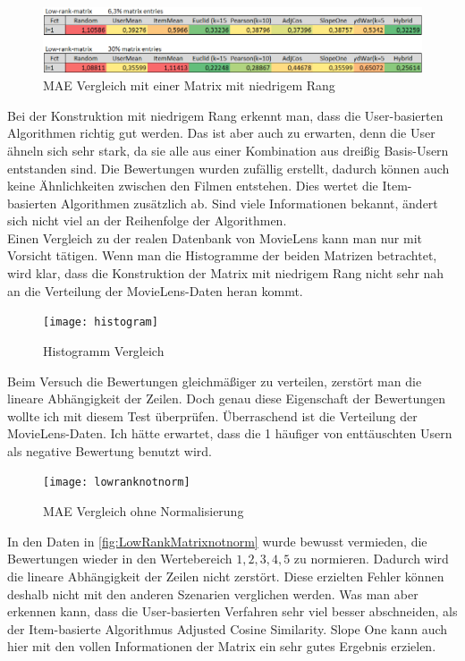 \begin{figure}[h!]
	\centering
	\includegraphics[width=1\linewidth]{bilder/lowrank}
	\caption{MAE Vergleich mit einer Matrix mit niedrigem Rang}
	\label{fig:LowRankMatrix}
\end{figure}
\FloatBarrier
Bei der Konstruktion mit niedrigem Rang erkennt man, dass die User-basierten Algorithmen richtig gut werden. Das ist aber auch zu erwarten, denn die User ähneln sich sehr stark, da sie alle aus einer Kombination aus dreißig Basis-Usern entstanden sind. Die Bewertungen wurden zufällig erstellt, dadurch können auch keine Ähnlichkeiten zwischen den Filmen entstehen. Dies wertet die Item-basierten Algorithmen zusätzlich ab. Sind viele Informationen bekannt, ändert sich nicht viel an der Reihenfolge der Algorithmen.\\
Einen Vergleich zu der realen Datenbank von MovieLens kann man nur mit Vorsicht tätigen. Wenn man die Histogramme der beiden Matrizen betrachtet, wird klar, dass die Konstruktion der Matrix mit niedrigem Rang nicht sehr nah an die Verteilung der MovieLens-Daten heran kommt.
\begin{figure}[h!]
	\centering
	\texttt{[image: histogram]}
	\caption{Histogramm Vergleich}
	\label{fig:histogram}
\end{figure}
\FloatBarrier
Beim Versuch die Bewertungen gleichmäßiger zu verteilen, zerstört man die lineare Abhängigkeit der Zeilen. Doch genau diese Eigenschaft der Bewertungen wollte ich mit diesem Test überprüfen. Überraschend ist die Verteilung der MovieLens-Daten. Ich hätte erwartet, dass die 1 häufiger von enttäuschten Usern als negative Bewertung benutzt wird.

\begin{figure}[h!]
	\centering
	\texttt{[image: lowranknotnorm]}
	\caption{MAE Vergleich ohne Normalisierung}
	\label{fig:LowRankMatrixnotnorm}
\end{figure}
\FloatBarrier
In den Daten in \autoref{fig:LowRankMatrixnotnorm} wurde bewusst vermieden, die Bewertungen wieder in den Wertebereich ${1,2,3,4,5}$ zu normieren. Dadurch wird die lineare Abhängigkeit der Zeilen nicht zerstört. Diese erzielten Fehler können deshalb nicht mit den anderen Szenarien verglichen werden. Was man aber erkennen kann, dass die User-basierten Verfahren sehr viel besser abschneiden, als der Item-basierte Algorithmus Adjusted Cosine Similarity. Slope One kann auch hier mit den vollen Informationen der Matrix ein sehr gutes Ergebnis erzielen.
\clearpage